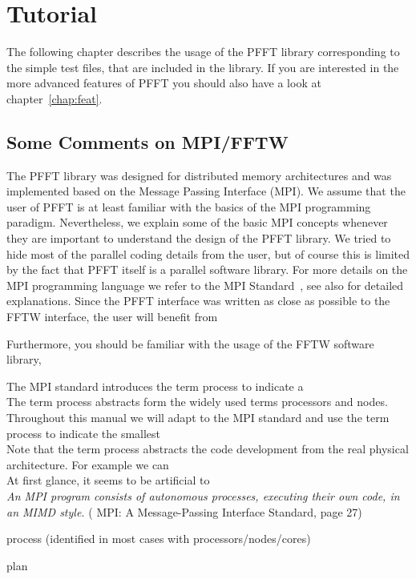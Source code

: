 \chapter{Tutorial}\label{chap:tuto}

The following chapter describes the usage of the PFFT library corresponding to the simple test files,
that are included in the library. If you are interested in the more advanced features of PFFT you
should also have a look at chapter~\ref{chap:feat}.

\section{Some Comments on MPI/FFTW}

The PFFT library was designed for distributed memory architectures and was implemented based on the Message Passing Interface (MPI).
We assume that the user of PFFT is at least familiar with the basics of the MPI programming paradigm.
Nevertheless, we explain some of the basic MPI concepts whenever they are important to understand
the design of the PFFT library. We tried to hide most of the parallel coding details from the user,
but of course this is limited by the fact that PFFT itself is a parallel software library.
For more details on the MPI programming language we refer to the MPI Standard~\cite{MPI-2.2}, see also \cite{GrLuTh99} for detailed explanations.
Since the PFFT interface was written as close as possible to the FFTW interface, the user will benefit from


Furthermore, you should be familiar with the usage of the FFTW software library,


The MPI standard introduces the term process to indicate a \\
The term process abstracts form the widely used terms processors and nodes. \\
Throughout this manual we will adapt to the MPI standard and use the term process to indicate the smallest \\
Note that the term process abstracts the code development from the real physical architecture. For example we can \\
At first glance, it seems to be artificial to \\
\emph{An MPI program consists of autonomous processes, executing their own code, in an MIMD style.}
( MPI: A Message-Passing Interface Standard, page 27)
\begin{compactitem}
  \item process (identified in most cases with processors/nodes/cores)
  \item plan
\end{compactitem}



